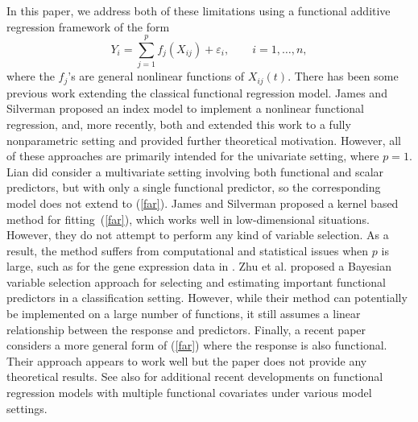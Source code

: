 \documentclass[aos,MSNbibl,dvips]{arximspdf}
\begin{document}
In this paper, we address both of these limitations using a functional
additive regression framework of the form
%
\begin{equation}
\label{far} Y_i = \sum_{j=1}^p
f_j (X_{ij} )+ \varepsilon_i, \qquad i = 1,
\ldots, n,
\end{equation}
%
where the $f_j$'s are general nonlinear functions of $X_{ij}(t)$.
There has been some previous work extending the classical functional
regression model. James and Silverman \cite{james5} proposed an index model to
implement a nonlinear functional \mbox{regression}, and, more recently, both
\cite{ferraty4} and \cite{chen2} extended this work to a fully
nonparametric setting and provided further theoretical motivation.
However, all of these approaches are primarily intended for the
univariate setting, where $p=1$. Lian \cite{lian1} did consider a multivariate
setting involving both functional and scalar predictors, but with only
a single functional predictor, so the corresponding model does not
extend to (\ref{far}).
James and Silverman \cite{james5} proposed a kernel based method for fitting~(\ref{far}), which works well in low-dimensional situations. However,
they do not attempt to perform any kind of variable selection. As a
result, the method suffers from computational and statistical issues
when $p$ is large, such as for the gene expression data in \cite
{storey1}. Zhu et al. \cite{zhu2} proposed a Bayesian variable selection
approach for selecting and estimating important functional predictors
in a classification setting.
However, while their method can potentially be implemented on a large
number of functions, it still assumes a linear relationship between the
response and predictors. Finally, a recent paper \cite{fan1} considers
a more general form of (\ref{far}) where the response is also
functional. Their approach appears to work well but the paper does not
provide any theoretical results. See also \cite
{Febrero-Bande,Goia12,Mas} for additional recent developments on
functional regression
models with multiple functional covariates under various model settings.
\end{document}
